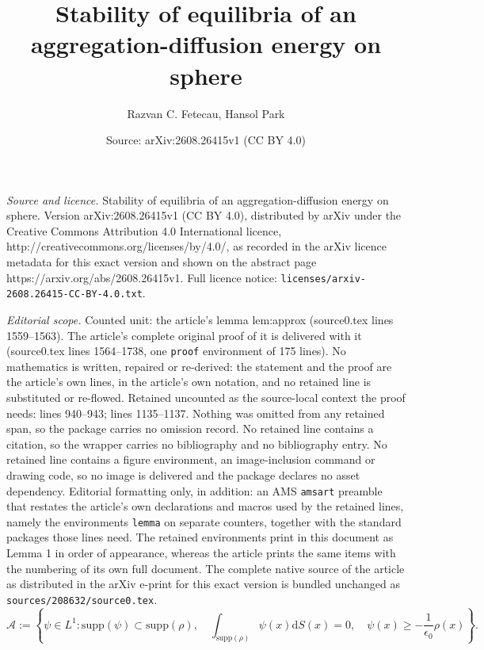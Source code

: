 \documentclass[10pt,a4paper]{amsart}
\title{Stability of equilibria of an aggregation-diffusion energy on sphere}
\author{Razvan C. Fetecau, Hansol Park}
\date{Source: arXiv:2608.26415v1 (CC BY 4.0)}
\newcommand{\dx}{\mathrm{d}S (x)}
\newcommand{\supp}{\mathrm{supp}(\rho)}
\begin{document}
\maketitle

\noindent\emph{Source and licence.} Stability of equilibria of an aggregation-diffusion energy on sphere. Version arXiv:2608.26415v1 (CC BY 4.0), distributed by arXiv under the Creative Commons Attribution 4.0 International licence, http://creativecommons.org/licenses/by/4.0/, as recorded in the arXiv licence metadata for this exact version and shown on the abstract page https://arxiv.org/abs/2608.26415v1. Full licence notice: \texttt{licenses/arxiv-2608.26415-CC-BY-4.0.txt}.\par\smallskip

\noindent\textit{Editorial scope.} Counted unit: the article's lemma lem:approx (source0.tex lines 1559--1563). The article's complete original proof of it is delivered with it (source0.tex lines 1564--1738, one \texttt{proof} environment of 175 lines). No mathematics is written, repaired or re-derived: the statement and the proof are the article's own lines, in the article's own notation, and no retained line is substituted or re-flowed.  Retained uncounted as the source-local context the proof needs: lines 940--943; lines 1135--1137.  Nothing was omitted from any retained span, so the package carries no omission record.  No retained line contains a citation, so the wrapper carries no bibliography and no bibliography entry.  No retained line contains a figure environment, an image-inclusion command or drawing code, so no image is delivered and the package declares no asset dependency.  Editorial formatting only, in addition: an AMS \texttt{amsart} preamble that restates the article's own declarations and macros used by the retained lines, namely the environments \texttt{lemma} on separate counters, together with the standard packages those lines need.  The retained environments print in this document as Lemma 1 in order of appearance, whereas the article prints the same items with the numbering of its own full document.  The complete native source of the article as distributed in the arXiv e-print for this exact version is bundled unchanged as \texttt{sources/208632/source0.tex}.
\begin{equation}
\label{eqn:calA}
\mathcal{A}:=\left\{\psi \in L^1:\mathrm{supp}(\psi)\subset \supp,\quad\int_{\supp}\psi(x)\dx=0,\quad \psi(x)\geq-\frac{1}{\epsilon_0}\rho(x)\right\}.
\end{equation}
\end{document}
